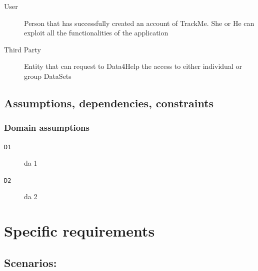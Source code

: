 \documentclass[12pt]{article}
\begin{document}
      \begin{description}
        \item [User] Person that has successfully created an account of TrackMe. She or He can exploit all the functionalities of the application
        \item [Third Party] Entity that can request to Data4Help  the access  to either individual or group DataSets
      \end{description}

  \subsection{Assumptions, dependencies, constraints}

    \subsubsection{Domain assumptions}

      \begin{description}
        \item[\texttt{D1}] da 1
        \item[\texttt{D2}] da 2
      \end{description}


\clearpage
\section{Specific requirements}
\label{sec:specreq}

\subsection{Scenarios:}
\end{document}
